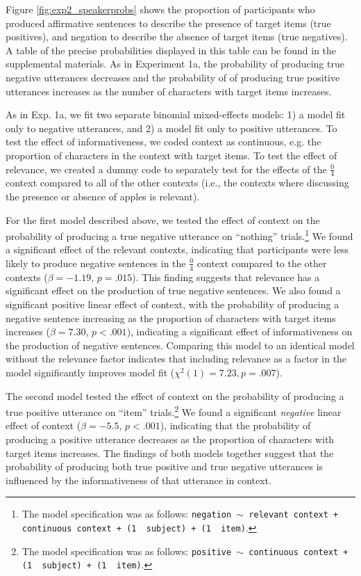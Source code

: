 \documentclass[man, floatsintext, noapacite]{apa6}
\begin{document}
Figure \ref{fig:exp2_speakerprobs} shows the proportion of participants who produced affirmative sentences to describe the presence of target items (true positives), and negation to describe the absence of target items (true negatives). A table of the precise probabilities displayed in this table can be found in the supplemental materials. As in Experiment 1a, the probability of producing true negative utterances decreases and the probability of of producing true positive utterances increases as the number of characters with target items increases.

As in Exp. 1a, we fit two separate binomial mixed-effects models: 1) a model fit only to negative utterances, and 2) a model fit only to positive utterances. To test the effect of informativeness, we coded context as continuous, e.g. the proportion of characters in the context with target items. To test the effect of relevance, we created a dummy code to separately test for the effects of the  $\frac{0}{4}$ context compared to all of the other contexts (i.e., the contexts where discussing the presence or absence of apples is relevant). 

For the first model described above, we tested the effect of context on the probability of producing a true negative utterance on ``nothing'' trials.\footnote{The model specification was as follows: \texttt{negation $\sim$  relevant context + continuous context + (1~\textbar~subject) +  (1~\textbar~item)}.} We  found a significant effect of the relevant contexts, indicating that participants were less likely to produce negative sentences in the $\frac{0}{4}$ context compared to the other contexts ($\beta= -1.19$, $p = .015$). This finding suggests that relevance has a significant effect on the production of true negative sentences. We also found a significant positive linear effect of context, with the probability of producing a negative sentence increasing as the proportion of characters with target items increases ($\beta= 7.30$, $p< .001$), indicating a significant effect of informativeness on the production of negative sentences. Comparing this model to an identical model without the relevance factor indicates that including relevance as a factor in the model significantly improves model fit ($\chi^2(1)= 7.23, p = .007$). 

The second model tested the effect of context on the probability of producing a true positive utterance on ``item'' trials.\footnote{The model specification was as follows: \texttt{positive $\sim$  continuous context + (1~\textbar~subject) +  (1~\textbar~item)}.} We found a significant \textit{negative} linear effect of context ($\beta= -5.5$, $p< .001$), indicating that the probability of producing a positive utterance decreases as the proportion of characters with target items increases. The findings of both models together suggest that the probability of producing both true positive and true negative utterances is influenced by the informativeness of that utterance in context.
\end{document}
